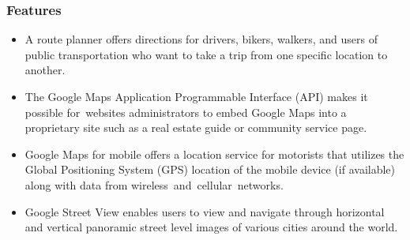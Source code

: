 	\subsubsection{Features}
		\begin{itemize}
			\item A route planner offers directions for drivers, bikers, walkers, and users of public transportation who want to take a trip from one specific location to another.
			\item The Google Maps Application Programmable Interface (API) makes it possible for websites administrators to embed Google Maps into a proprietary site such as a real estate guide or community service page.
			\item Google Maps for mobile offers a location service for motorists that utilizes the Global Positioning System (GPS) location of the mobile device (if available) along with data from wireless and cellular networks.
			\item Google Street View enables users to view and navigate through horizontal and vertical panoramic street level images of various cities around the world.
		\end{itemize}